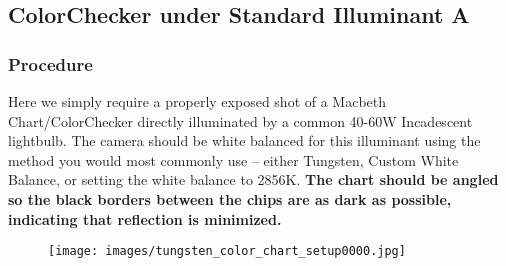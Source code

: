 \documentclass[twoside]{article}
\begin{document}
\subsection{ColorChecker under Standard Illuminant A}\label{chartA}

\subsubsection{Procedure}
Here we simply require a properly exposed shot of a Macbeth Chart/ColorChecker directly illuminated by a common 40-60W Incadescent lightbulb. The camera should be white balanced for this illuminant using the method you would most commonly use -- either Tungsten, Custom White Balance, or setting the white balance to 2856K. \textbf{The chart should be angled so the black borders between the chips are as dark as possible, indicating that reflection is minimized.}

\begin{figure}[ht]
    \centering
    \texttt{[image: images/tungsten\_color\_chart\_setup0000.jpg]}
\end{figure}
\end{document}
